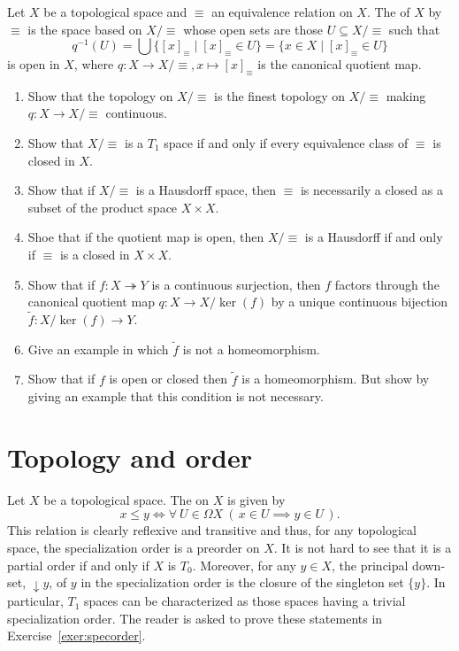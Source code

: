 \begin{exercise}\label{exer:quotspace}
Let $X$ be a topological space and $\equiv$ an equivalence relation on $X$. The  of $X$ by $\equiv$ is the space based on $X/\equiv$ whose open sets are those $U\subseteq X/\equiv$ such that
\[
q^{-1}(U)=\bigcup\{[x]_\equiv\mid [x]_\equiv\in U\}=\{x\in X\mid [x]_\equiv\in U\}
\]
is open in $X$, where $q\colon X\to X/\equiv, x\mapsto [x]_\equiv$ is the canonical quotient map.
\begin{enumerate}
	\item Show that the topology on $X/\equiv$ is the finest topology on $X/\equiv$ making $q\colon X\to X/\equiv$ continuous.
	\item Show that $X/\equiv$ is a $T_1$ space if and only if every equivalence class of $\equiv$ is closed in $X$.
	\item Show that if $X/\equiv$ is a Hausdorff space, then $\equiv$ is necessarily a closed as a subset of the product space $X\times X$. 	
\item Shoe that if the quotient map is open, then $X/\equiv$ is a Hausdorff if and only if $\equiv$ is a closed in $X\times X$. 	
	\item Show that if $f\colon X\twoheadrightarrow Y$ is a continuous surjection, then $f$ factors through the canonical quotient map $q\colon X\to X/\ker(f)$ by a unique continuous bijection $\tilde{f}\colon X/\ker(f)\to Y$.
	\item Give an example in which $\tilde{f}$ is not a homeomorphism.
	\item Show that if $f$ is open or closed then $\tilde{f}$ is a homeomorphism. But show by giving an example that this condition is not necessary.
\end{enumerate}
\end{exercise}

\section{Topology and order}\label{sec:TopOrd}

Let $X$ be a topological space. The  on $X$ is given by
\[
x\leq y \iff \forall \ U\in\Omega X\ (\,x\in U\implies y\in U\,).
\]
This relation is clearly reflexive and transitive and thus, for any topological space, the specialization order is a preorder on $X$. It is not hard to see that it is a partial order if and only if $X$ is $T_0$. Moreover, for any $y \in X$, the principal down-set, ${\downarrow}y$, of $y$ in the specialization order is the closure of the singleton set $\{y\}$. In particular, $T_1$ spaces can be characterized as those spaces having a trivial specialization order. The reader is asked to prove these statements in Exercise~\ref{exer:specorder}.


